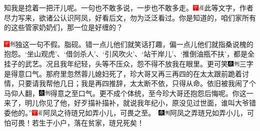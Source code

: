 {{知我是捻着一把汗儿呢。一句也不敢多说，一步也不敢多走。{\includegraphics[width=3mm]{../Images/00002}\includegraphics[width=3mm]{../Images/00010}\footnotesize \kaishu 此等文字，作者尽力写来，欲诸公认识阿凤，好看后文，勿为泛泛看过。}你是知道的，咱们家所有的这些管家奶奶们，那一位是好缠的？{{\includegraphics[width=3mm]{../Images/00002}\includegraphics[width=3mm]{../Images/00011}\footnotesize \kaishu 独这一句不假。脂砚。}错一点儿他们就笑话打趣，偏一点儿他们就指桑说槐的抱怨。‘坐山观虎’、‘借剑杀人’、‘引风吹火’、‘站干岸儿’、‘推倒油瓶不扶’，都是全挂子的武艺。况且我年纪轻，头等不压众，怨不得不放我在眼里。更可笑{\includegraphics[width=3mm]{../Images/00004}\includegraphics[width=3mm]{../Images/00011}\footnotesize \kaishu 三字是得意口气。}那府里忽然蓉儿媳妇死了，珍大哥又再三再四的在太太跟前跪着讨情，只要请我帮他几日；我是再四推辞，太太断不依，只得从命。依旧被我闹了个马仰人翻，{\includegraphics[width=3mm]{../Images/00004}\includegraphics[width=3mm]{../Images/00011}\footnotesize \kaishu 得意之至口气。}更不成个体统，至今珍大哥还抱怨后悔呢。你这一来了，明儿你见了他，好歹描补描补，就说我年纪小，原没见过世面，谁叫大爷错委他的。”{\includegraphics[width=3mm]{../Images/00002}\includegraphics[width=3mm]{../Images/00010}\footnotesize \kaishu 阿凤之待琏兄如弄小儿，可畏之至。　\includegraphics[width=3mm]{../Images/00004}\includegraphics[width=3mm]{../Images/00011}\footnotesize \kaishu 阿凤之弄琏兄如弄小儿，可怕可畏！若生于小户，落在贫家，琏兄死矣！}

}}}
